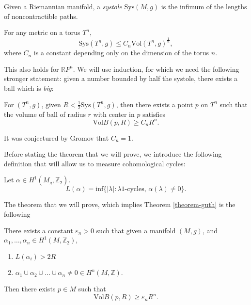 \begin{definition}
\label{definition-systole}
Given a Riemannian manifold,
a {\it systole} $\text{Sys}(M,g)$ is the
infimum of the lengths
of noncontractible paths.
\end{definition}

\begin{theorem}[Gromov]
\label{theorem-gromov}
For any metric on a torus $T^n$,
$$
\text{Sys}(T^n,g) \leq C_n
\text{Vol}(T^n,g)^{\frac{1}{n}},
$$
where $C_n$ is a constant depending only on
the dimension
of the torus $n$.
\end{theorem}

\noindent
This also holds for $\mathbb{R}P^n$. We will
use induction,
for which we need the following stronger
statement:
given a number bounded by half the systole,
there exists a ball
which is {\it big}:

\begin{theorem}[Guth]
\label{theorem-guth}
For $(T^n,g)$, given
$R<\frac{1}{2}\text{Sys}(T^n,g)$,
then there exists a point $p$ on $T^n$
such that the volume of ball of radius $r$
with center in $p$
satisfies
$$
\text{Vol}B(p,R) \geq C_nR^n.
$$
\end{theorem}

\noindent
It was conjectured by Gromov that $C_n=1$.

\medskip\noindent
Before stating the theorem that we will
prove, we introduce the
following definition that will allow us to
measure cohomological cycles:

\begin{definition}
\label{definition-measu-cohom-cycle}
Let $\alpha \in H^{1}(M_g,\mathbb{Z}_2)$.
$$
L(\alpha)
=\text{inf}\{|\lambda|:\lambda\text{
1-cycles, }\alpha(\lambda)\neq 0\}.
$$
\end{definition}

\noindent
The theorem that we will prove, which implies
Theorem \ref{theorem-guth}
is the following

\begin{theorem}
\label{theorem-bound-classes}
There exists a constant $\varepsilon_n>0$
such that given a manifold $(M,g)$, and
$\alpha_1,\ldots,\alpha_n \in
H^1(M,\mathbb{Z}_2)$,
\begin{enumerate}
\item $L(\alpha_i)>2R$
\label{item-positive}
\item
\label{item-cup} $\alpha_1 \cup  \alpha_2
\cup \ldots \cup \alpha_n \neq 0 \in
H^n(M,\mathbb{Z})$.
\end{enumerate}

\noindent
Then there exists $p \in M$ such that
$$
\text{Vol}B(p,R) \geq \varepsilon_nR^n.
$$
\end{theorem}

